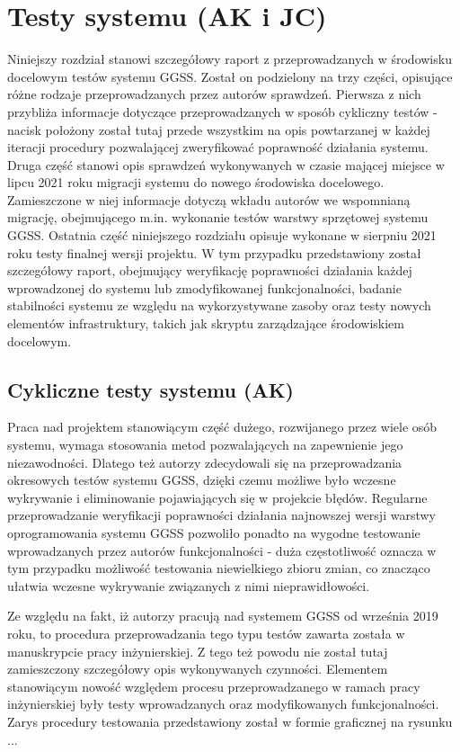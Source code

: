 \chapter{Testy systemu (AK i JC)}
\label{cha:tests}
Niniejszy rozdział stanowi szczegółowy raport z przeprowadzanych w środowisku docelowym testów systemu GGSS. Został on podzielony na trzy części, opisujące różne rodzaje przeprowadzanych przez autorów sprawdzeń. Pierwsza z nich przybliża informacje dotyczące przeprowadzanych w sposób cykliczny testów - nacisk położony został tutaj przede wszystkim na opis powtarzanej w każdej iteracji procedury pozwalającej zweryfikować poprawność działania systemu. Druga część stanowi opis sprawdzeń wykonywanych w czasie mającej miejsce w lipcu 2021 roku migracji systemu do nowego środowiska docelowego. Zamieszczone w niej informacje dotyczą wkładu autorów we wspomnianą migrację, obejmującego m.in. wykonanie testów warstwy sprzętowej systemu GGSS. Ostatnia część niniejszego rozdziału opisuje wykonane w sierpniu 2021 roku testy finalnej wersji projektu. W tym przypadku przedstawiony został szczegółowy raport, obejmujący weryfikację poprawności działania każdej wprowadzonej do systemu lub zmodyfikowanej funkcjonalności, badanie stabilności systemu ze względu na wykorzystywane zasoby oraz testy nowych elementów infrastruktury, takich jak skryptu zarządzające środowiskiem docelowym.

\section{Cykliczne testy systemu (AK)}
Praca nad projektem stanowiącym część dużego, rozwijanego przez wiele osób systemu, wymaga stosowania metod pozwalających na zapewnienie jego niezawodności. Dlatego też autorzy zdecydowali się na przeprowadzania okresowych testów systemu GGSS, dzięki czemu możliwe było wczesne wykrywanie i eliminowanie pojawiających się w projekcie błędów. Regularne przeprowadzanie weryfikacji poprawności działania najnowszej wersji warstwy oprogramowania systemu GGSS pozwoliło ponadto na wygodne testowanie wprowadzanych przez autorów funkcjonalności - duża częstotliwość oznacza w tym przypadku możliwość testowania niewielkiego zbioru zmian, co znacząco ułatwia wczesne wykrywanie związanych z nimi nieprawidłowości.

Ze względu na fakt, iż autorzy pracują nad systemem GGSS od września 2019 roku, to procedura przeprowadzania tego typu testów zawarta została w manuskrypcie pracy inżynierskiej. Z tego też powodu nie został tutaj zamieszczony szczegółowy opis wykonywanych czynności. Elementem stanowiącym nowość względem procesu przeprowadzanego w ramach pracy inżynierskiej były testy wprowadzanych oraz modyfikowanych funkcjonalności. Zarys procedury testowania przedstawiony został w formie graficznej na rysunku ... 

